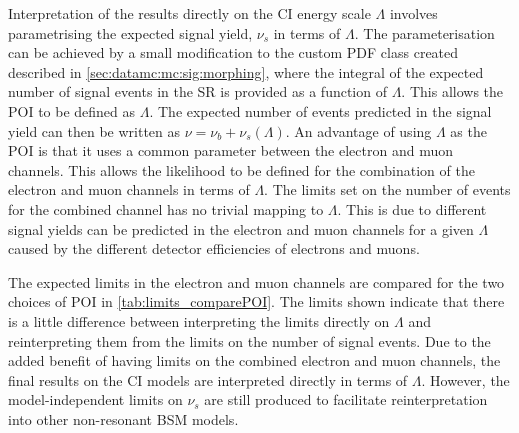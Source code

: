 Interpretation of the results directly on the CI energy scale $\Lambda$ involves parametrising the expected signal yield, $\nu_s$ in terms of $\Lambda$. The parameterisation can be achieved by a small modification to the custom PDF class created described in \cref{sec:datamc:mc:sig:morphing}, where the integral of the expected number of signal events in the SR is provided as a function of $\Lambda$. This allows the POI to be defined as $\Lambda$. The expected number of events predicted in the signal yield can then be written as $\nu = \nu_b +\nu_s(\Lambda)$. An advantage of using $\Lambda$ as the POI is that it uses a common parameter between the electron and muon channels. This allows the likelihood to be defined for the combination of the electron and muon channels in terms of $\Lambda$. The limits set on the number of events for the combined channel has no trivial mapping to $\Lambda$. This is due to different signal yields can be predicted in the electron and muon channels for a given $\Lambda$ caused by the different detector efficiencies of electrons and muons. 

The expected limits in the electron and muon channels are compared for the two choices of POI in \cref{tab:limits_comparePOI}. The limits shown indicate that there is a little difference between interpreting the limits directly on $\Lambda$ and reinterpreting them from the limits on the number of signal events. Due to the added benefit of having limits on the combined electron and muon channels, the final results on the CI models are interpreted directly in terms of $\Lambda$. However, the model-independent limits on $\nu_s$ are still produced to facilitate reinterpretation into other non-resonant BSM models. 


